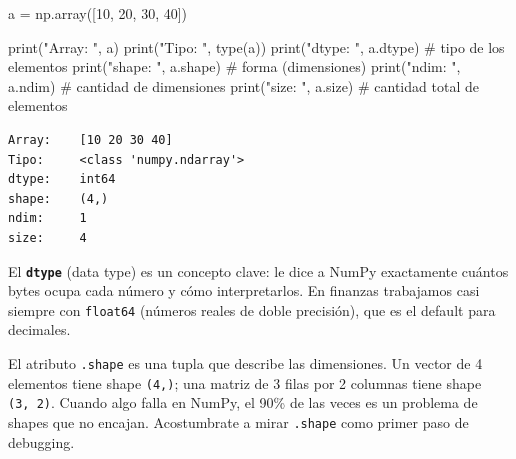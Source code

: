\documentclass[
  spanish,
  letterpaper,
  DIV=11,
  numbers=noendperiod]{scrreprt}
\newenvironment{Shaded}{\begin{snugshade}}{\end{snugshade}}
\newcommand{\BuiltInTok}[1]{\textcolor[rgb]{0.00,0.23,0.31}{#1}}
\newcommand{\CommentTok}[1]{\textcolor[rgb]{0.37,0.37,0.37}{#1}}
\newcommand{\DecValTok}[1]{\textcolor[rgb]{0.68,0.00,0.00}{#1}}
\newcommand{\NormalTok}[1]{\textcolor[rgb]{0.00,0.23,0.31}{#1}}
\newcommand{\OperatorTok}[1]{\textcolor[rgb]{0.37,0.37,0.37}{#1}}
\newcommand{\StringTok}[1]{\textcolor[rgb]{0.13,0.47,0.30}{#1}}
\begin{document}
\label{array-basico}
\begin{Shaded}
\begin{Highlighting}[]
\NormalTok{a }\OperatorTok{=}\NormalTok{ np.array([}\DecValTok{10}\NormalTok{, }\DecValTok{20}\NormalTok{, }\DecValTok{30}\NormalTok{, }\DecValTok{40}\NormalTok{])}

\BuiltInTok{print}\NormalTok{(}\StringTok{"Array:   "}\NormalTok{, a)}
\BuiltInTok{print}\NormalTok{(}\StringTok{"Tipo:    "}\NormalTok{, }\BuiltInTok{type}\NormalTok{(a))}
\BuiltInTok{print}\NormalTok{(}\StringTok{"dtype:   "}\NormalTok{, a.dtype)     }\CommentTok{\# tipo de los elementos}
\BuiltInTok{print}\NormalTok{(}\StringTok{"shape:   "}\NormalTok{, a.shape)     }\CommentTok{\# forma (dimensiones)}
\BuiltInTok{print}\NormalTok{(}\StringTok{"ndim:    "}\NormalTok{, a.ndim)      }\CommentTok{\# cantidad de dimensiones}
\BuiltInTok{print}\NormalTok{(}\StringTok{"size:    "}\NormalTok{, a.size)      }\CommentTok{\# cantidad total de elementos}
\end{Highlighting}
\end{Shaded}

\begin{verbatim}
Array:    [10 20 30 40]
Tipo:     <class 'numpy.ndarray'>
dtype:    int64
shape:    (4,)
ndim:     1
size:     4
\end{verbatim}

El \textbf{\texttt{dtype}} (data type) es un concepto clave: le dice a
NumPy exactamente cuántos bytes ocupa cada número y cómo interpretarlos.
En finanzas trabajamos casi siempre con \texttt{float64} (números reales
de doble precisión), que es el default para decimales.

\begin{tcolorbox}[enhanced jigsaw, bottomrule=.15mm, colback=white, opacitybacktitle=0.6, arc=.35mm, toprule=.15mm, opacityback=0, breakable, titlerule=0mm, left=2mm, coltitle=black, colbacktitle=quarto-callout-note-color!10!white, colframe=quarto-callout-note-color-frame, leftrule=.75mm, toptitle=1mm, bottomtitle=1mm, title=\textcolor{quarto-callout-note-color}{\faInfo}\hspace{0.5em}{shape: la forma manda}, rightrule=.15mm]

El atributo \texttt{.shape} es una tupla que describe las dimensiones.
Un vector de 4 elementos tiene shape \texttt{(4,)}; una matriz de 3
filas por 2 columnas tiene shape \texttt{(3,\ 2)}. Cuando algo falla en
NumPy, el 90\% de las veces es un problema de shapes que no encajan.
Acostumbrate a mirar \texttt{.shape} como primer paso de debugging.

\end{tcolorbox}
\end{document}

